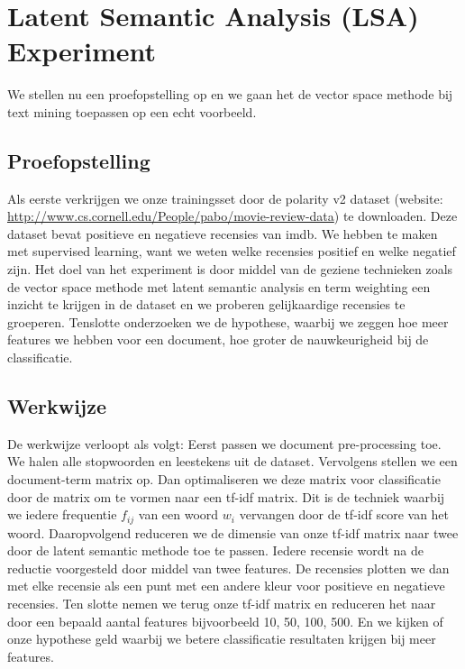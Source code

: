 \section{Latent Semantic Analysis (LSA) Experiment}\label{Latent Semantic Analysis Experiment (LSA) Experiment}

We stellen nu een proefopstelling op en we gaan het de vector space methode bij text mining toepassen op een echt voorbeeld.

\subsection{Proefopstelling}\label{Proefopstelling}
Als eerste verkrijgen we onze trainingsset door de polarity v2 dataset (website: \url{http://www.cs.cornell.edu/People/pabo/movie-review-data}) te downloaden. Deze dataset bevat positieve en negatieve recensies van imdb. We hebben te maken met supervised learning, want we weten welke recensies positief en welke negatief zijn. Het doel van het experiment is door middel van de geziene technieken zoals de vector space methode met latent semantic analysis en term weighting een inzicht te krijgen in de dataset en we proberen gelijkaardige recensies te groeperen. Tenslotte onderzoeken we de hypothese, waarbij we zeggen hoe meer features we hebben voor een document, hoe groter de nauwkeurigheid bij de classificatie.


\subsection{Werkwijze}\label{Werkwijze}

De werkwijze verloopt als volgt:
Eerst passen we document pre-processing toe. We halen alle stopwoorden en leestekens uit de dataset. Vervolgens stellen we een document-term matrix op. Dan optimaliseren we deze matrix voor classificatie door de matrix om te vormen naar een tf-idf matrix. Dit is de techniek waarbij we iedere frequentie $f_{ij}$ van een woord $w_{i}$ vervangen door de tf-idf score van het woord. Daaropvolgend reduceren we de dimensie van onze tf-idf matrix naar twee door de latent semantic methode toe te passen. Iedere recensie wordt na de reductie voorgesteld door middel van twee features. 
De recensies plotten we dan met elke recensie als een punt met een andere kleur voor positieve en negatieve recensies.
Ten slotte nemen we terug onze tf-idf matrix en reduceren het naar door een bepaald aantal features bijvoorbeeld 10, 50, 100, 500. En we kijken of onze hypothese geld waarbij we betere classificatie resultaten krijgen bij meer features.

